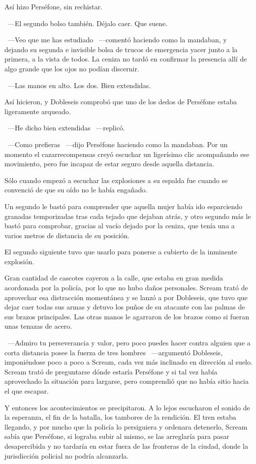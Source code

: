 Así hizo Perséfone, sin rechistar.

~---El segundo bolso también. Déjalo caer. Que suene.

~---Veo que me has estudiado ~---comentó haciendo como la mandaban, y dejando su segunda e invisible bolsa de trucos de emergencia yacer junto a la primera, a la vista de todos. La ceniza no tardó en confirmar la presencia allí de algo grande que los ojos no podían discernir.

~---Las manos en alto. Los dos. Bien extendidas.

Así hicieron, y Dobleseis comprobó que uno de los dedos de Perséfone estaba ligeramente arqueado.

~---He dicho bien extendidas ~---replicó.

~---Como prefieras ~---dijo Perséfone haciendo como la mandaban. Por un momento el cazarrecompensas creyó escuchar un ligerísimo clic acompañando ese movimiento, pero fue incapaz de estar seguro desde aquella distancia.

Sólo cuando empezó a escuchar las explosiones a su espalda fue cuando se convenció de que su oído no le había engañado.

Un segundo le bastó para comprender que aquella mujer había ido esparciendo granadas temporizadas tras cada tejado que dejaban atrás, y otro segundo más le bastó para comprobar, gracias al vacío dejado por la ceniza, que tenía una a varios metros de distancia de su posición.

El segundo siguiente tuvo que usarlo para ponerse a cubierto de la inminente explosión.

Gran cantidad de cascotes cayeron a la calle, que estaba en gran medida acordonada por la policía, por lo que no hubo daños personales. Scream trató de aprovechar esa distracción momentánea y se lanzó a por Dobleseis, que tuvo que dejar caer todas sus armas y detuvo los puños de su atacante con las palmas de sus brazos principales. Las otras manos le agarraron de los brazos como si fueran unas tenazas de acero.

~---Admiro tu perseverancia y valor, pero poco puedes hacer contra alguien que a corta distancia posee la fuerza de tres hombres ~---argumentó Dobleseis, imponiéndose poco a poco a Scream, cada vez más inclinado en dirección al suelo. Scream trató de preguntarse dónde estaría Perséfone y si tal vez había aprovechado la situación para largarse, pero comprendió que no había sitio hacia el que escapar.

Y entonces los acontecimientos se precipitaron. A lo lejos escucharon el sonido de la esperanza, el fin de la batalla, los tambores de la rendición. El tren estaba llegando, y por mucho que la policía lo persiguiera y ordenara detenerlo, Scream sabía que Perséfone, si lograba subir al mismo, se las arreglaría para pasar desapercibida y no tardaría en estar fuera de las fronteras de la ciudad, donde la jurisdicción policial no podría alcanzarla.

